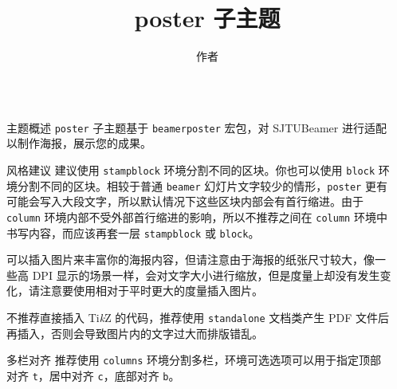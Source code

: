 \documentclass{ctexbeamer}
\begin{document}
\title{poster 子主题}
\author{作者}
\logo{\zhlogo}
\begin{frame}[fragile]
  \begin{columns}[T]
    \begin{column}{.45\textwidth}

      \begin{stampblock}{主题概述}
        \texttt{poster} 子主题基于 \texttt{beamerposter} 宏包\cite{beamerposter}，对
        SJTUBeamer 进行适配以制作海报，展示您的成果。
      \end{stampblock}

      \begin{stampblock}{风格建议}
        建议使用 \texttt{stampblock} 环境分割不同的区块。你也可以使用 \texttt{block}
        环境分割不同的区块。相较于普通 \texttt{beamer} 幻灯片文字较少的情形，\texttt{poster}
        更有可能会写入大段文字，所以默认情况下这些区块内部会有首行缩进。由于 \texttt{column}
        环境内部不受外部首行缩进的影响，所以不推荐之间在
        \texttt{column} 环境中书写内容，而应该再套一层 \texttt{stampblock} 或 \texttt{block}。

        可以插入图片来丰富你的海报内容，但请注意由于海报的纸张尺寸较大，像一些高 DPI
        显示的场景一样，会对文字大小进行缩放，但是度量上却没有发生变化，请注意要使用相对于平时更大的度量插入图片。

        不推荐直接插入 Ti\emph{k}Z 的代码，推荐使用 \texttt{standalone} 文档类产生 PDF
        文件后再插入，否则会导致图片内的文字过大而排版错乱。
      \end{stampblock}

      \begin{stampblock}{多栏对齐}
        推荐使用 \texttt{columns} 环境分割多栏，环境可选选项可以用于指定顶部对齐 \texttt{t}，居中对齐
        \texttt{c}，底部对齐 \texttt{b}。

      \end{stampblock}

    \end{column}
    \begin{column}{.45\textwidth}


\end{column}
\end{columns}
\end{frame}
\end{document}
